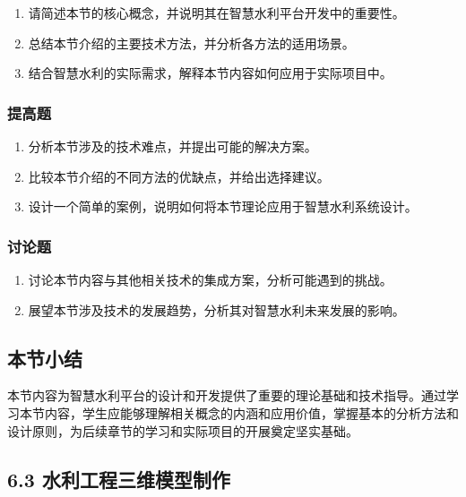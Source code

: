 \begin{enumerate}
\def\labelenumi{\arabic{enumi}.}
\tightlist
\item
  请简述本节的核心概念，并说明其在智慧水利平台开发中的重要性。
\item
  总结本节介绍的主要技术方法，并分析各方法的适用场景。
\item
  结合智慧水利的实际需求，解释本节内容如何应用于实际项目中。
\end{enumerate}

\subsubsection{提高题}\label{ux63d0ux9ad8ux9898-3}

\begin{enumerate}
\def\labelenumi{\arabic{enumi}.}
\setcounter{enumi}{3}
\tightlist
\item
  分析本节涉及的技术难点，并提出可能的解决方案。
\item
  比较本节介绍的不同方法的优缺点，并给出选择建议。
\item
  设计一个简单的案例，说明如何将本节理论应用于智慧水利系统设计。
\end{enumerate}

\subsubsection{讨论题}\label{ux8ba8ux8bbaux9898-3}

\begin{enumerate}
\def\labelenumi{\arabic{enumi}.}
\setcounter{enumi}{6}
\tightlist
\item
  讨论本节内容与其他相关技术的集成方案，分析可能遇到的挑战。
\item
  展望本节涉及技术的发展趋势，分析其对智慧水利未来发展的影响。
\end{enumerate}

\subsection{本节小结}\label{ux672cux8282ux5c0fux7ed3-2}

本节内容为智慧水利平台的设计和开发提供了重要的理论基础和技术指导。通过学习本节内容，学生应能够理解相关概念的内涵和应用价值，掌握基本的分析方法和设计原则，为后续章节的学习和实际项目的开展奠定坚实基础。

\subsection{6.3 水利工程三维模型制作}\label{ux6c34ux5229ux5de5ux7a0bux4e09ux7ef4ux6a21ux578bux5236ux4f5c}

